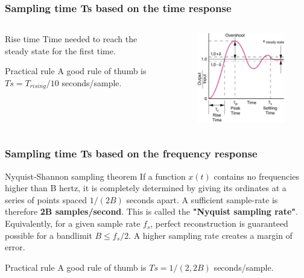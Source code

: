\begin{frame}
	\frametitle{Sampling time Ts based on the time response}
\begin{columns}
	\begin{column}{0.5\textwidth}
	\begin{block}{Rise time}
		Time needed to reach the steady state for the first time.
	\end{block}
	\begin{block}{Practical rule}
		A good rule of thumb is $Ts = T_{rising}/10$ seconds/sample.
	\end{block}
	\end{column}
	
	\begin{column}{0.5\textwidth}
		\begin{figure}
			\centering
			\includegraphics[width=1\linewidth]{rise_time}
		\end{figure}
	\end{column}
\end{columns}
\end{frame}

\begin{frame}
	\frametitle{Sampling time Ts based on the frequency response}
	\begin{block}{Nyquist-Shannon sampling theorem}
		If a function $x(t)$ contains no frequencies higher than B hertz, it is completely determined by giving its ordinates at a series of points spaced $1/(2B)$ seconds apart. A sufficient sample-rate is therefore \textbf{2B samples/second}. This is called the \textbf{"Nyquist sampling rate"}. Equivalently, for a given sample rate $f_s$, perfect reconstruction is guaranteed possible for a bandlimit $B ≤ f_s/2$. A higher sampling rate creates a margin of error.
	\end{block}
	\begin{block}{Practical rule}
		A good rule of thumb is $Ts = 1/(2,2B)$ seconds/sample.
	\end{block}
\end{frame}


